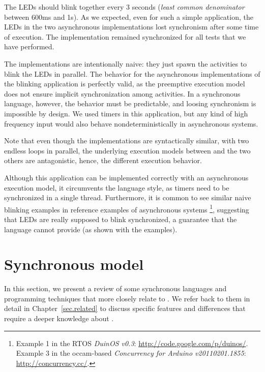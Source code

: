 The LEDs should blink together every 3 seconds (\emph{least common denominator} 
between 600ms and 1s).
As we expected, even for such a simple application, the LEDs in the two 
asynchronous implementations lost synchronism after some time of execution.
The \CEU{} implementation remained synchronized for all tests that we have 
performed.

The implementations are intentionally naive: they just spawn the activities to 
blink the LEDs in parallel.
The behavior for the asynchronous implementations of the blinking application 
is perfectly valid, as the preemptive execution model does not ensure implicit 
synchronization among activities.
In a synchronous language, however, the behavior must be predictable, and 
loosing synchronism is impossible by design.
We used timers in this application, but any kind of high frequency input would 
also behave nondeterministically in asynchronous systems.

Note that even though the implementations are syntactically similar, with two 
endless loops in parallel, the underlying execution models between \CEU and the 
two others are antagonistic, hence, the different execution behavior.

Although this application can be implemented correctly with an asynchronous 
execution model, it circumvents the language style, as timers need to be 
synchronized in a single thread.
Furthermore, it is common to see similar naive blinking examples in reference 
examples of asynchronous systems%
\footnote{
Example 1 in the RTOS \emph{DuinOS v0.3}:
\url{http://code.google.com/p/duinos/}.\\
Example 3 in the occam-based \emph{Concurrency for Arduino v20110201.1855}:
\url{http://concurrency.cc/}.
}, suggesting that LEDs are really supposed to blink synchronized, a guarantee 
that the language cannot provide (as shown with the examples).


\section{Synchronous model}

In this section, we present a review of some synchronous languages and 
programming techniques that more closely relate to \CEU.
%
We refer back to them in detail in Chapter~\ref{sec.related} to discuss 
specific features and differences that require a deeper knowledge about \CEU.

